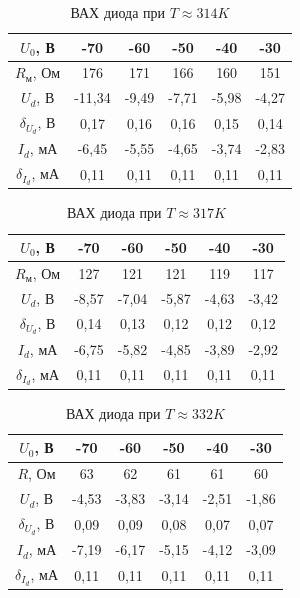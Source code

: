 \documentclass[a4paper,12pt]{article}
\begin{document}
\begin{table}[h]
\centering
\caption{ВАХ диода при $T \approx 314 K$}
\begin{tabular}{|c|c|c|c|c|c|}
\hline
$U_0$, В & -70 & -60 & -50 & -40 & -30 \\ \hline
$R_м$, Ом & 176 & 171 & 166 & 160 & 151 \\ \hline
$U_d$, В & -11,34 & -9,49 & -7,71 & -5,98 & -4,27 \\ \hline
$\delta_{U_d}$, В & 0,17 & 0,16 & 0,16 & 0,15 & 0,14 \\ \hline
$I_d$, мА & -6,45 & -5,55 & -4,65 & -3,74 & -2,83 \\ \hline
$\delta_{I_d}$, мА & 0,11 & 0,11 & 0,11 & 0,11 & 0,11 \\ \hline
\end{tabular}
\end{table}

\begin{table}[h]
\centering
\caption{ВАХ диода при $T \approx 317 K$}
\begin{tabular}{|c|c|c|c|c|c|}
\hline
$U_0$, В & -70 & -60 & -50 & -40 & -30 \\ \hline
$R_м$, Ом & 127 & 121 & 121 & 119 & 117 \\ \hline
$U_d$, В & -8,57 & -7,04 & -5,87 & -4,63 & -3,42 \\ \hline
$\delta_{U_d}$, В & 0,14 & 0,13 & 0,12 & 0,12 & 0,12 \\ \hline
$I_d$, мА & -6,75 & -5,82 & -4,85 & -3,89 & -2,92 \\ \hline
$\delta_{I_d}$, мА & 0,11 & 0,11 & 0,11 & 0,11 & 0,11 \\ \hline
\end{tabular}
\end{table}

\begin{table}[h]
\centering
\caption{ВАХ диода при $T \approx 332 K$}
\begin{tabular}{|c|c|c|c|c|c|}
\hline
$U_0$, В & -70 & -60 & -50 & -40 & -30 \\ \hline
$R$, Ом & 63 & 62 & 61 & 61 & 60 \\ \hline
$U_d$, В & -4,53 & -3,83 & -3,14 & -2,51 & -1,86 \\ \hline
$\delta_{U_d}$, В & 0,09 & 0,09 & 0,08 & 0,07 & 0,07 \\ \hline
$I_d$, мА & -7,19 & -6,17 & -5,15 & -4,12 & -3,09 \\ \hline
$\delta_{I_d}$, мА & 0,11 & 0,11 & 0,11 & 0,11 & 0,11 \\ \hline
\end{tabular}
\end{table}
\end{document}
